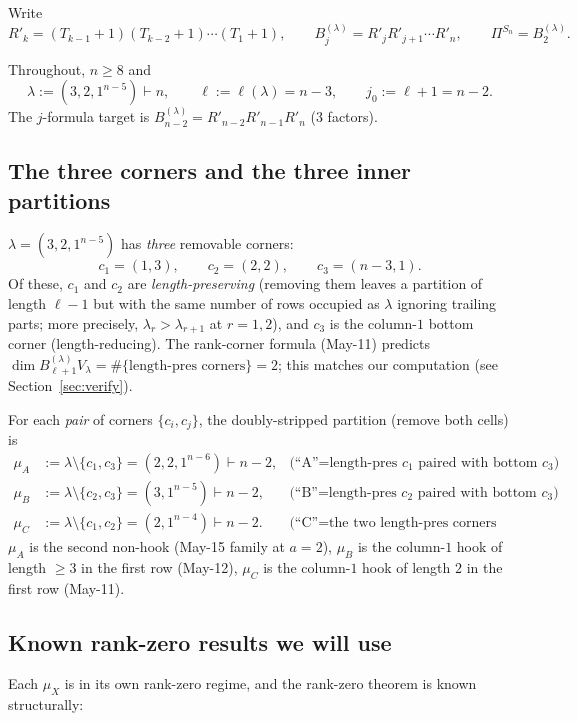 \documentclass[11pt]{article}
\theoremstyle{definition}
\begin{document}
Write
\[
   R'_k=(T_{k-1}{+}1)(T_{k-2}{+}1)\cdots(T_1{+}1),
   \qquad
   B_j^{(\lambda)}=R'_j R'_{j+1}\cdots R'_n,
   \qquad
   \Pi^{S_n}=B_2^{(\lambda)}.
\]

Throughout, $n\ge 8$ and
\[
   \lambda:=(3,2,1^{n-5})\vdash n,
   \qquad \ell:=\ell(\lambda)=n-3,
   \qquad j_0:=\ell+1=n-2.
\]
The $j$-formula target is
$B_{n-2}^{(\lambda)}=R'_{n-2}R'_{n-1}R'_n$ ($3$ factors).

\subsection{The three corners and the three inner partitions}

$\lambda=(3,2,1^{n-5})$ has \emph{three} removable corners:
\[
   c_1=(1,3),\qquad c_2=(2,2),\qquad c_3=(n{-}3,1).
\]
Of these, $c_1$ and $c_2$ are \emph{length-preserving}
(removing them leaves a partition of length $\ell-1$ but with the
same number of rows occupied as $\lambda$ ignoring trailing parts;
more precisely, $\lambda_r>\lambda_{r+1}$ at $r=1,2$), and $c_3$ is
the column-$1$ bottom corner (length-reducing).  The rank-corner
formula (May-11) predicts $\dim B_{\ell+1}^{(\lambda)} V_\lambda=
\#\{\text{length-pres corners}\}=2$; this matches our computation
(see Section~\ref{sec:verify}).

For each \emph{pair} of corners $\{c_i,c_j\}$, the doubly-stripped
partition (remove both cells) is
\begin{align*}
   \mu_A &:= \lambda\setminus\{c_1,c_3\}=(2,2,1^{n-6})\vdash n-2,
   &\text{(``A''=length-pres $c_1$ paired with bottom $c_3$)} \\
   \mu_B &:= \lambda\setminus\{c_2,c_3\}=(3,1^{n-5})\vdash n-2,
   &\text{(``B''=length-pres $c_2$ paired with bottom $c_3$)} \\
   \mu_C &:= \lambda\setminus\{c_1,c_2\}=(2,1^{n-4})\vdash n-2.
   &\text{(``C''=the two length-pres corners with each other)}
\end{align*}
$\mu_A$ is the second non-hook (May-15 family at $a=2$), $\mu_B$ is
the column-$1$ hook of length $\ge 3$ in the first row (May-12),
$\mu_C$ is the column-$1$ hook of length $2$ in the first row
(May-11).

\subsection{Known rank-zero results we will use}

Each $\mu_X$ is in its own rank-zero regime, and the rank-zero
theorem is known structurally:
\end{document}
